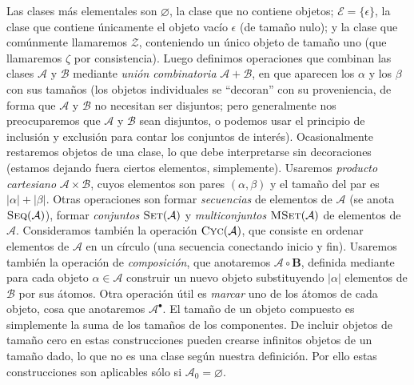   Las clases más elementales son \(\varnothing\),
  la clase que no contiene objetos;
  \(\mathcal{E} = \{\epsilon\}\),
  la clase que contiene únicamente el objeto vacío \(\epsilon\)
  (de tamaño nulo);
  y la clase que comúnmente llamaremos \(\mathcal{Z}\),
  conteniendo un único objeto de tamaño uno
  (que llamaremos \(\zeta\) por consistencia).
  Luego definimos operaciones que combinan
  las clases \(\mathcal{A}\) y \(\mathcal{B}\)
  mediante \emph{unión combinatoria} \(\mathcal{A} + \mathcal{B}\),
  en que aparecen los \(\alpha\) y los \(\beta\) con sus tamaños
  (los objetos individuales se ``decoran'' con su proveniencia,
   de forma que \(\mathcal{A}\) y  \(\mathcal{B}\)
   no necesitan ser disjuntos;
   pero generalmente nos preocuparemos
   que \(\mathcal{A}\) y \(\mathcal{B}\)
   sean disjuntos,
   o podemos usar el principio de inclusión y exclusión
   para contar los conjuntos de interés).
  Ocasionalmente restaremos objetos de una clase,
  lo que debe interpretarse sin decoraciones
  (estamos dejando fuera ciertos elementos,
   simplemente).
  Usaremos \emph{producto cartesiano}
  \(\mathcal{A} \times \mathcal{B}\),%
  cuyos elementos son pares \((\alpha, \beta)\)
  y el tamaño del par
  es \(\lvert \alpha \rvert + \lvert \beta \rvert\).
  Otras operaciones son formar \emph{secuencias}%
  de elementos de \(\mathcal{A}\)
  (se anota \(\operatorname{\textsc{Seq}}(\mathcal{A})\)),
  formar \emph{conjuntos}%
  \(\operatorname{\textsc{Set}}(\mathcal{A})\)
  y \emph{multiconjuntos}
  \(\operatorname{\textsc{MSet}}(\mathcal{A})\)
  de elementos de \(\mathcal{A}\).
  Consideramos también la operación \(\operatorname{\textsc{Cyc}}(\mathcal{A})\),
  que consiste en ordenar elementos de \(\mathcal{A}\) en un círculo
  (una secuencia conectando inicio y fin).%
  Usaremos también la operación de \emph{composición},
  que anotaremos \(\mathcal{A} \circ \mathbf{B}\),
  definida mediante para cada objeto \(\alpha \in \mathcal{A}\)
  construir un nuevo objeto substituyendo
  \(\lvert \alpha \rvert\) elementos de \(\mathcal{B}\) por sus átomos.
  Otra operación útil es \emph{marcar} uno de los átomos de cada objeto,
  cosa que anotaremos \(\mathcal{A}^\bullet\).
  El tamaño de un objeto compuesto
  es simplemente la suma de los tamaños de los componentes.
  De incluir objetos de tamaño cero
  en estas construcciones pueden crearse infinitos objetos de un tamaño dado,
  lo que no es una clase según nuestra definición.
  Por ello estas construcciones son aplicables
  sólo si \(\mathcal{A}_0 = \varnothing\).

